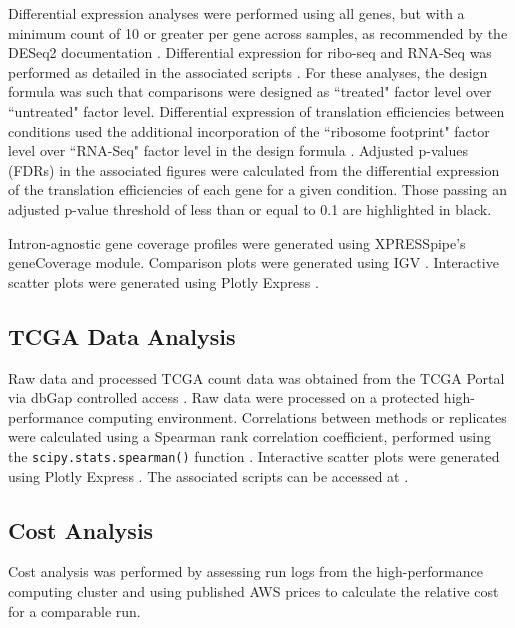 \documentclass[10pt, oneside]{article}
\begin{document}
Differential expression analyses were performed using all genes, but with a minimum count of 10 or greater per gene across samples, as recommended by the DESeq2 documentation \cite{deseq2}. Differential expression for ribo-seq and RNA-Seq was performed as detailed in the associated scripts \cite{manuscript}. For these analyses, the design formula was such that comparisons were designed as ``treated" factor level over ``untreated" factor level. Differential expression of translation efficiencies between conditions used the additional incorporation of the ``ribosome footprint" factor level over ``RNA-Seq" factor level in the design formula \cite{deseq2,isrib_riboseq,ingolia_meth}. Adjusted p-values (FDRs) in the associated figures were calculated from the differential expression of the translation efficiencies of each gene for a given condition. Those passing an adjusted p-value threshold of less than or equal to 0.1 are highlighted in black. \par

Intron-agnostic gene coverage profiles were generated using XPRESSpipe's geneCoverage module. Comparison plots were generated using IGV \cite{igv}. Interactive scatter plots were generated using Plotly Express \cite{plotly}. \par

\subsection{TCGA Data Analysis}
Raw data and processed TCGA count data was obtained from the TCGA Portal \cite{tcga} via dbGap controlled access \cite{dbgap}. Raw data were processed on a protected high-performance computing environment. Correlations between methods or replicates were calculated using a Spearman rank correlation coefficient, performed using the \texttt{scipy.stats.spearman()} function \cite{spearman_rnaseq}. Interactive scatter plots were generated using Plotly Express \cite{plotly}. The associated scripts can be accessed at \cite{manuscript}. \par


\subsection{Cost Analysis}
Cost analysis was performed by assessing run logs from the high-performance computing cluster and using published AWS prices \cite{aws_ec2, aws_s3} to calculate the relative cost for a comparable run.
\end{document}
